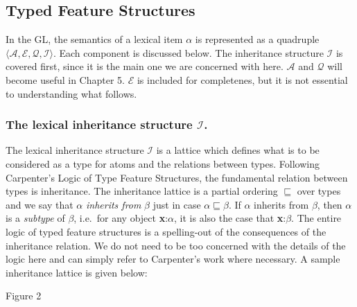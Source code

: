 \subsection{Typed Feature Structures}

In the GL, the semantics of a lexical item $\alpha$ is represented as a quadruple $\langle \mathcal{A},\mathcal{E},\mathcal{Q},\mathcal{I}\rangle$. Each component is discussed below. The inheritance structure $\mathcal{I}$ is covered first, since it is the main one we are concerned with here. $\mathcal{A}$ and $\mathcal{Q}$ will become useful in Chapter 5. $\mathcal{E}$ is included for completenes, but it is not essential to understanding what follows.

\subsubsection{The lexical inheritance structure $\mathcal{I}$.}

The lexical inheritance structure $\mathcal{I}$ is a lattice which defines what is to be considered as a type for atoms and the relations between types. Following Carpenter's Logic of Type Feature Structures, the fundamental relation between types is inheritance. The inheritance lattice is a partial ordering $\sqsubseteq$ over types and we say that $\alpha$ \emph{inherits from} $\beta$ just in case $\alpha\sqsubseteq\beta$. If $\alpha$ inherits from $\beta$, then $\alpha$ is a \emph{subtype} of $\beta$, i.e.\ for any object {\bf x}:$\alpha$, it is also the case that {\bf x}:$\beta$. The entire logic of typed feature structures is a spelling-out of the consequences of the inheritance relation. We do not need to be too concerned with the details of the logic here and can simply refer to Carpenter's work where necessary. A sample inheritance lattice is given below:
\par\vspace{5mm}
\par\vspace{3mm}
\begin{center}Figure 2\end{center}
\par\vspace{3mm}

